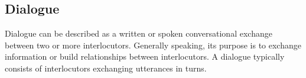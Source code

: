 


\subsection{Dialogue}





Dialogue can be described as a written or spoken conversational exchange between two or more interlocutors. Generally speaking, its purpose is to exchange information or build relationships between interlocutors. A dialogue typically consists of interlocutors exchanging utterances in turns. 


